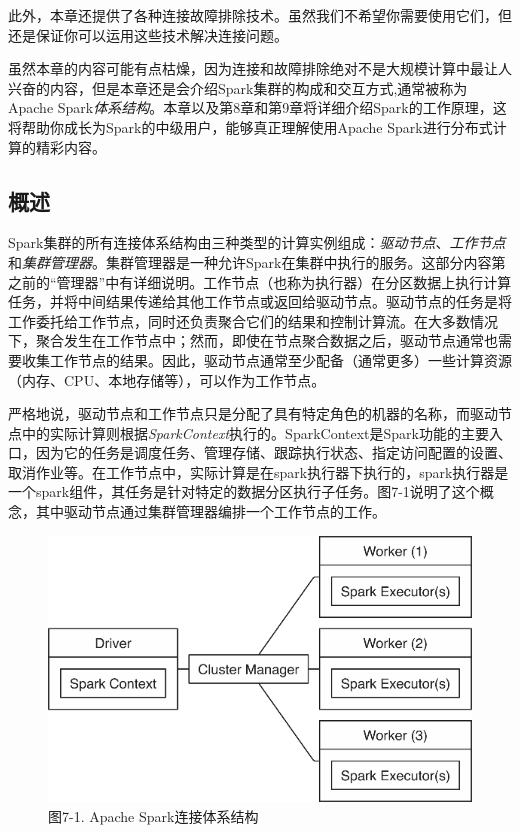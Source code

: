 \documentclass[
]{article}
\begin{document}
此外，本章还提供了各种连接故障排除技术。虽然我们不希望你需要使用它们，但还是保证你可以运用这些技术解决连接问题。

虽然本章的内容可能有点枯燥，因为连接和故障排除绝对不是大规模计算中最让人兴奋的内容，但是本章还是会介绍Spark集群的构成和交互方式,通常被称为Apache
Spark\emph{体系结构}。本章以及第8章和第9章将详细介绍Spark的工作原理，这将帮助你成长为Spark的中级用户，能够真正理解使用Apache
Spark进行分布式计算的精彩内容。

\hypertarget{ux6982ux8ff0-6}{%
\subsection{概述}\label{ux6982ux8ff0-6}}

Spark集群的所有连接体系结构由三种类型的计算实例组成：\emph{驱动节点}、\emph{工作节点}和\emph{集群管理器}。集群管理器是一种允许Spark在集群中执行的服务。这部分内容第之前的``管理器''中有详细说明。工作节点（也称为执行器）在分区数据上执行计算任务，并将中间结果传递给其他工作节点或返回给驱动节点。驱动节点的任务是将工作委托给工作节点，同时还负责聚合它们的结果和控制计算流。在大多数情况下，聚合发生在工作节点中；然而，即使在节点聚合数据之后，驱动节点通常也需要收集工作节点的结果。因此，驱动节点通常至少配备（通常更多）一些计算资源（内存、CPU、本地存储等），可以作为工作节点。

严格地说，驱动节点和工作节点只是分配了具有特定角色的机器的名称，而驱动节点中的实际计算则根据\emph{SparkContext}执行的。SparkContext是Spark功能的主要入口，因为它的任务是调度任务、管理存储、跟踪执行状态、指定访问配置的设置、取消作业等。在工作节点中，实际计算是在spark执行器下执行的，spark执行器是一个spark组件，其任务是针对特定的数据分区执行子任务。图7-1说明了这个概念，其中驱动节点通过集群管理器编排一个工作节点的工作。

\begin{figure}
\centering
\includegraphics{figures/7_1.png}
\caption{图7-1. Apache Spark连接体系结构}
\end{figure}
\end{document}
